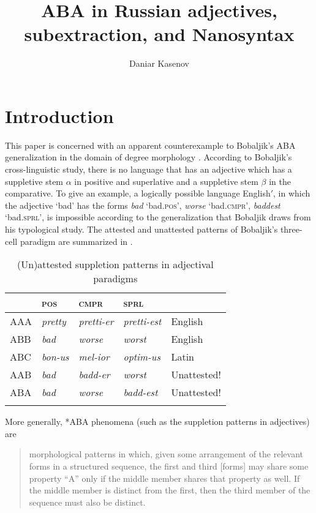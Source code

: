 \documentclass[output=paper,colorlinks,citecolor=brown]{langscibook}
\author{Daniar Kasenov\affiliation{HSE University / Lomonosov Moscow State University}}
\title{ABA in Russian adjectives, subextraction, and Nanosyntax}
\begin{document}
\maketitle

\section{Introduction}\label{kas:sec:intro}

This paper is concerned with an apparent counterexample to Bobaljik's ABA generalization in the domain of degree morphology \citep{Bobaljik:2012}. According to Bobaljik's cross-linguistic study, there is no language that has an adjective which has a suppletive stem $\alpha$ in positive and superlative and a suppletive stem $\beta$ in the comparative. To give an example, a logically possible language English$'$, in which the adjective `bad' has the forms \textit{bad} `bad.\textsc{pos}', \textit{worse} `bad.\textsc{cmpr}', \textit{baddest} `bad.\textsc{sprl}', is impossible according to the generalization that Bobaljik draws from his typological study. The attested and unattested patterns of Bobaljik's three-cell paradigm are summarized in .

\begin{table}
\caption{(Un)attested suppletion patterns in adjectival paradigms}
\label{kas:tab:bobaljik:results}
 \begin{tabularx}{.8\textwidth}{lQQQl} 
  \lsptoprule
            &\textsc{pos}   &\textsc{cmpr}  & \textsc{sprl} & \\
  \midrule
    AAA       &\textit{pretty} &\textit{pretti-er}  &\textit{pretti-est}  & English\\
    ABB       &\textit{bad} &\textit{worse}  &\textit{worst}  & English\\
    ABC       &\textit{bon-us} &\textit{mel-ior}  &\textit{optim-us}  & Latin\\
    AAB       &\textit{bad} &\textit{badd-er}  &\textit{worst}  & Unattested!\\
    ABA       &\textit{bad} &\textit{worse}  &\textit{badd-est}  & Unattested!\\
  \lspbottomrule
 \end{tabularx}
\end{table}

More generally, *ABA phenomena (such as the suppletion patterns in adjectives) are

\begin{quote}morphological patterns in which, given some arrangement of the relevant forms in a structured sequence, the first and third [forms] may share some property ``A'' only if the middle member shares that property as well. If the middle member is distinct from the first, then the third member of the sequence must also be distinct. \citep[1--2]{Bobaljik:2018}
\end{quote}
\end{document}
